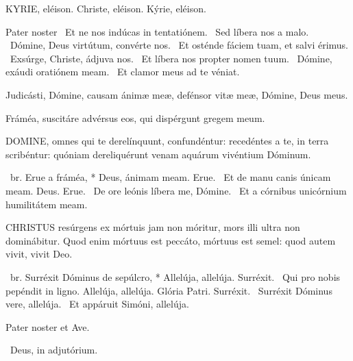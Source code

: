 
KYRIE, eléison. Christe, eléison. Kýrie, eléison.

Pater noster  \V\ Et ne nos indúcas in tentatiónem. \R\ Sed líbera nos a malo. \V\ Dómine, Deus virtútum, convérte nos. \R\ Et osténde fáciem tuam, et salvi érimus. \V\ Exsúrge, Christe, ádjuva nos. \R\ Et líbera nos propter nomen tuum. \V\ Dómine, exáudi oratiónem meam. \R\ Et clamor meus ad te véniat.



 Judicásti, Dómine, causam ánimæ meæ, defénsor vitæ meæ, Dómine, Deus meus.


 Fráméa, suscitáre advérsus eos, qui dispérgunt gregem meum.


\lettrine[lines=2]{D}{OMINE}, omnes qui te derelínquunt, confundéntur: recedéntes a te, in terra scribéntur: quóniam dereliquérunt venam aquárum vivéntium Dóminum.

\R\ br. Erue a fráméa, * Deus, ánimam meam. Erue. \V\ Et de manu canis únicam meam. Deus. Erue. \V\ De ore leónis líbera me, Dómine. \R\ Et a córnibus unicórnium humilitátem meam.




\lettrine[lines=2]{C}{HRISTUS} resúrgens ex mórtuis jam non móritur, mors illi ultra non dominábitur. Quod enim mórtuus est peccáto, mórtuus est semel: quod autem vivit, vivit Deo.

\R\ br. Surréxit Dóminus de sepúlcro, * Allelúja, allelúja. Surréxit. \V\ Qui pro nobis pepéndit in ligno. Allelúja, allelúja. Glória Patri. Surréxit. \V\ Surréxit Dóminus vere, allelúja. \R\ Et appáruit Simóni, allelúja.


\sectionornament


Pater noster et Ave.

\V\ Deus, in adjutórium.


